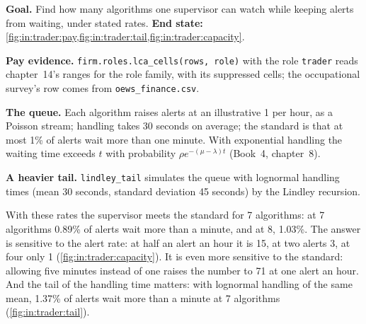 \begin{tutorial}
\textbf{Goal.} Find how many algorithms one supervisor can watch while keeping alerts from waiting, under stated rates.
\textbf{End state:} \cref{fig:in:trader:pay,fig:in:trader:tail,fig:in:trader:capacity}.
\begin{tutsteps}
\item \textbf{Pay evidence.} \texttt{firm.roles.lca\_cells(rows, role)} with the role \texttt{trader} reads chapter~14's ranges for the role family,
with its suppressed cells; the occupational survey's row comes from \texttt{oews\_finance.csv}.
\item \textbf{The queue.} Each algorithm raises alerts at an illustrative 1 per hour, as a Poisson stream; handling takes
30 seconds on average; the standard is that at most 1\% of alerts wait more than one minute. With exponential handling
the waiting time exceeds $t$ with probability $\rho e^{-(\mu-\lambda)t}$ (Book~4, chapter~8).
\label{lst:in:trader:mm1}
\item \textbf{A heavier tail.} \texttt{lindley\_tail} simulates the queue with lognormal handling times (mean 30 seconds,
standard deviation 45 seconds) by the Lindley recursion.
\end{tutsteps}
\end{tutorial}

With these rates the supervisor meets the standard for 7 algorithms: at 7 algorithms 0.89\% of alerts wait more than a
minute, and at 8, 1.03\%. The answer is sensitive to the alert rate: at half an alert an hour it is 15, at two alerts 3, at
four only 1 (\cref{fig:in:trader:capacity}). It is even more sensitive to the standard: allowing five minutes instead of
one raises the number to 71 at one alert an hour. And the tail of the handling time matters: with lognormal handling of
the same mean, 1.37\% of alerts wait more than a minute at 7 algorithms (\cref{fig:in:trader:tail}).

